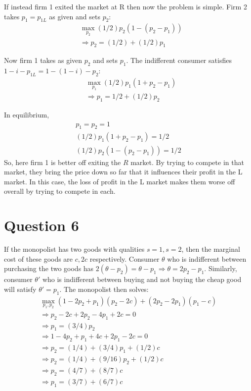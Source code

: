 \documentclass[11pt]{article} %
\begin{document}
If instead firm 1 exited the market at R then now the problem is simple. Firm 2 takes $p_{1} = p_{1L}$ as given and sets $p_2$:
\begin{align*}
&\max_{p_2} (1/2)p_2( 1 - ( p_2 - p_{1})) \\
&\Rightarrow p_2 = (1/2) + (1/2)p_{1}
\end{align*}

Now firm 1 takes as given $p_2$ and sets $p_1$. The indifferent consumer satisfies $1 - i - p_{1L} = 1-(1-i) - p_2$:
\begin{align*}
&\max_{p_{1}} (1/2)p_{1}(1+p_2-p_{1}) \\
&\Rightarrow p_{1} = 1/2 + (1/2)p_2 
\end{align*}

In equilibrium,
\begin{align*}
p_1 = p_2 = 1\\
(1/2)p_{1}(1+p_2-p_{1}) = 1/2\\
 (1/2)p_2( 1 - ( p_2 - p_{1})) = 1/2
\end{align*}
So, here firm 1 is better off exiting the $R$ market. By trying to compete in that market, they bring the price down so far that it influences their profit in the L market. In this case, the loss of profit in the L market makes them worse off overall by trying to compete in each.

\section{Question 6}
If the monopolist has two goods with qualities $s=1,s=2$, then the marginal cost of these goods are $c,2c$ respectively. Consumer $\theta$ who is indifferent between purchasing the two goods has $2(\theta - p_2) = \theta - p_1 \Rightarrow \theta = 2p_2 - p_1.$ Similarly, consumer $\theta'$ who is indifferent between buying and not buying the cheap good will satisfy $\theta' = p_1$. The monopolist then solves:
\begin{align*}
\max_{p_1,p_2} (1 - 2p_2 + p_1)(p_2 - 2c) + (2p_2 -  2p_1)(p_1 - c) \\
\Rightarrow p_2 - 2c + 2p_2 - 4p_1 + 2c = 0\\
\Rightarrow p_1 = (3/4)p_2 \\
\Rightarrow 1 - 4p_2 + p_1 +4c + 2p_1 - 2c = 0 \\
\Rightarrow p_2 = (1/4) + (3/4)p_1 +(1/2)c \\
\Rightarrow p_2 = (1/4) + (9/16)p_2 + (1/2)c \\
\Rightarrow p_2 = (4/7) + (8/7)c \\
\Rightarrow p_1 = (3/7) +(6/7)c
\end{align*}
\end{document}
